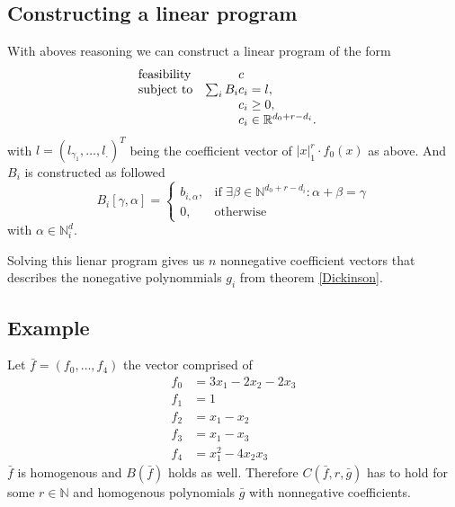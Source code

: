 \documentclass[./main.tex]{subfiles}
\begin{document}
\subsection{Constructing a linear program}
With aboves reasoning we can construct a linear program of the form
\begin{equation*}
\begin{array}{ll@{}ll}
\text{feasibility}  & &c &\\
\text{subject to}& \sum_i B_i &c_i = l,  &\\
& &c_i \geq 0,  &\\
                 &&c_i \in \mathbb{R}^{d_0+r-d_i}.              
\end{array}
\end{equation*}
with $l = (l_{\gamma_1},\dots,l_{.})^T$ being the coefficient vector of $\vert x \vert_1^r \cdot f_0(x)$ as above. And $B_i$ is constructed as followed
\begin{equation*}
B_i[\gamma,\alpha]    = \begin{cases}
    b_{i,\alpha},& \text{if } \exists \beta \in \mathbb{N}^{d_0+r-d_i} : \alpha + \beta = \gamma\\
    0,              & \text{otherwise}
\end{cases}
\end{equation*}
with $\alpha \in \mathbb{N}^d_i$. 

Solving this lienar program gives us $n$ nonnegative coefficient vectors that describes the nonegative polynommials $g_i$ from theorem \ref{Dickinson}. 

\subsection{Example}
Let $\bar{f}=(f_0,\dots,f_4)$ the vector comprised of 
\begin{align*}
f_0 &= 3x_1 -2x_2 -2x_3 \\
f_1 &= 1\\
f_2 &= x_1 -x_2\\
f_3 &= x_1 -x_3\\
f_4 &= x_1^2 -4x_2x_3
\end{align*}
$\bar{f}$ is homogenous and $B(\bar{f})$ holds as well. Therefore $C(\bar{f},r,\bar{g})$ has to hold for some $r\in \mathbb{N}$ and homogenous polynomials $\bar{g}$ with nonnegative coefficients. 
\end{document}
